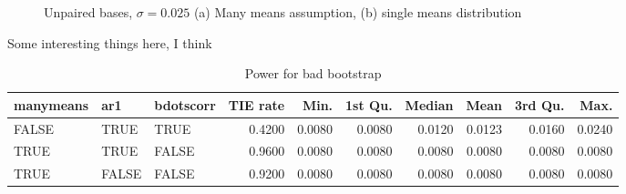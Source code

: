 \documentclass{article}
\begin{document}
\begin{figure}[H]
    \centering
    \caption{Unpaired bases, $\sigma = 0.025$ (a) Many means assumption, (b) single means distribution }
\label{fig:unpair_high_sig_dist_plots}
\end{figure}


Some interesting things here, I think

\begin{table}[ht]
\centering
\begin{tabular}{lllrrrrrrr}
  \hline
manymeans & ar1 & bdotscorr & TIE rate & Min. & 1st Qu. & Median & Mean & 3rd Qu. & Max. \\ 
  \hline
FALSE & TRUE & TRUE & 0.4200 & 0.0080 & 0.0080 & 0.0120 & 0.0123 & 0.0160 & 0.0240 \\ 
  TRUE & TRUE & FALSE & 0.9600 & 0.0080 & 0.0080 & 0.0080 & 0.0080 & 0.0080 & 0.0080 \\ 
  TRUE & FALSE & FALSE & 0.9200 & 0.0080 & 0.0080 & 0.0080 & 0.0080 & 0.0080 & 0.0080 \\ 
   \hline
\end{tabular}
\caption{Power for bad bootstrap} 
\label{tab:bad_boot_pwr2}
\end{table}
\end{document}
